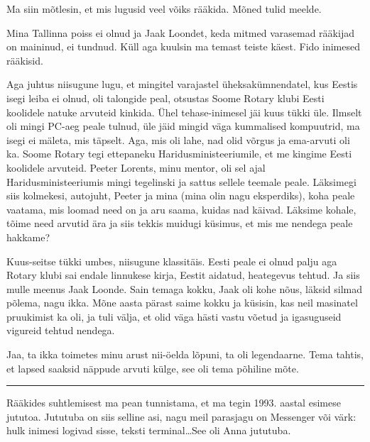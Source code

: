 Ma siin mõtlesin, et mis lugusid veel võiks rääkida. Mõned tulid meelde.

Mina Tallinna poiss ei olnud ja Jaak Loondet, keda 
mitmed varasemad rääkijad on maininud, ei tundnud. Küll aga kuulsin ma temast 
teiste käest. Fido inimesed rääkisid. 

Aga juhtus niisugune lugu, et mingitel varajastel  üheksakümnendatel, kus 
Eestis  isegi leiba ei olnud, oli talongide peal,  otsustas 
Soome Rotary klubi Eesti koolidele natuke arvuteid kinkida. Ühel 
tehase-inimesel jäi kuus tükki üle. Ilmselt oli mingi PC-aeg peale tulnud, üle 
jäid  mingid väga kummalised kompuutrid, ma isegi ei mäleta, mis täpselt. Aga, 
mis oli lahe, nad olid võrgus ja ema-arvuti oli ka. Soome Rotary tegi 
ettepaneku Haridusministeeriumile, et me kingime Eesti koolidele  arvuteid. 
Peeter Lorents, minu mentor, oli sel ajal 
Haridusministeeriumis mingi tegelinski ja sattus sellele teemale peale. 
Läksimegi siis kolmekesi, autojuht, Peeter ja mina (mina olin nagu eksperdiks), 
koha peale vaatama, mis loomad need on ja aru saama, kuidas nad käivad. Läksime 
kohale, tõime need arvutid ära ja siis tekkis muidugi küsimus, et mis me 
nendega peale hakkame? 


Kuus-seitse tükki umbes, niisugune klassitäis. Eesti peale ei olnud palju aga 
Rotary klubi sai endale linnukese kirja, Eestit aidatud, heategevus tehtud. Ja 
siis mulle meenus Jaak Loonde. Sain temaga kokku, Jaak 
oli kohe nõus, läksid silmad põlema, nagu ikka.  Mõne aasta pärast saime kokku 
ja küsisin, kas neil masinatel  pruukimist ka oli,  ja tuli välja, et olid väga 
hästi vastu võetud ja  igasuguseid vigureid tehtud nendega. 


Jaa, ta ikka toimetes minu arust nii-öelda lõpuni, ta oli legendaarne. Tema 
tahtis, et lapsed saaksid näppude arvuti külge, see oli tema põhiline mõte.


\bigskip
\noindent\rule{.3\textwidth}{.7pt}
\bigskip

Rääkides  suhtlemisest ma pean tunnistama, et ma tegin 1993. aastal esimese 
jututoa. Jututuba on siis selline asi, nagu meil parasjagu on Messenger või 
värk: hulk inimesi logivad sisse, teksti terminal\ldots See oli Anna 
jututuba.


